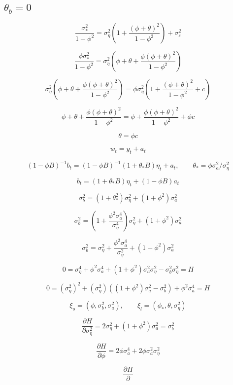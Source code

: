 \subsection{$\theta_b = 0$}

$$ \frac{\sigma_*^2}{1-\phi^2} = \sigma_\eta^2(1 + \frac{(\phi + \theta)^2}{1 - \phi^2}) + \sigma_\varepsilon^2 $$

$$ \frac{\phi\sigma_*^2}{1-\phi^2} = \sigma_\eta^2(\phi + \theta + \frac{\phi(\phi + \theta)^2}{1 - \phi^2}) $$


$$ \sigma_\eta^2(\phi + \theta + \frac{\phi(\phi + \theta)^2}{1 - \phi^2}) = \phi\sigma_\eta^2(1 + \frac{(\phi + \theta)^2}{1 - \phi^2} + c)$$

$$ \phi + \theta + \frac{\phi(\phi + \theta)^2}{1 - \phi^2} = \phi + \frac{\phi(\phi + \theta)^2}{1 - \phi^2} + \phi c$$

$$ \theta  =  \phi c$$



$$w_t = y_t + a_t$$

$$(1-\phi B)^{-1}b_t = (1 - \phi B)^{-1}(1 + \theta_* B)\eta_t + a_t, \qquad \theta_* = \phi\sigma_a^2 / \sigma_\eta^2$$

$$ b_t = (1 + \theta_*B)\eta_t + (1 - \phi B)a_t $$

$$ \sigma_b^2 = (1 + \theta_*^2)\sigma_\eta^2 + (1 + \phi^2)\sigma_a^2 $$

$$ \sigma_b^2 = (1 + \frac{\phi^2\sigma_a^4}{\sigma_\eta^4})\sigma_\eta^2 + (1 + \phi^2)\sigma_a^2 $$

$$ \sigma_b^2 = \sigma_\eta^2 + \frac{\phi^2\sigma_a^4}{\sigma_\eta^2} + (1 + \phi^2)\sigma_a^2 $$

$$ 0 = \sigma_\eta^4 + \phi^2\sigma_a^4 + (1 + \phi^2)\sigma_a^2\sigma_\eta^2 - \sigma_b^2\sigma_\eta^2 = H $$

$$ 0 = (\sigma_\eta^2)^2 + 
(\sigma_\eta^2)((1 + \phi^2)\sigma_a^2 - \sigma_b^2) +
\phi^2\sigma_a^4 = H $$

$$ \xi_o = (\phi, \sigma_b^2, \sigma_a^2),\qquad \xi_l= (\phi_*,\theta,\sigma_\eta^2)$$


$$\frac{\partial H}{\partial \sigma_\eta^2} = 2\sigma_\eta^2 + (1 + \phi^2)\sigma_a^2 = \sigma_b^2$$

$$\frac{\partial H}{\partial\phi} = 2\phi \sigma_a^4 + 2\phi\sigma_a^2\sigma_\eta^2 $$

$$\frac{\partial H}{\partial }$$








